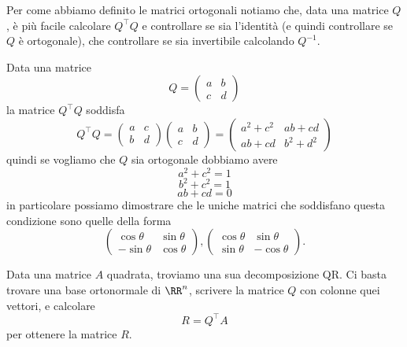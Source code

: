 \documentclass[11pt]{scrartcl}
\begin{document}
   	 Per come abbiamo definito le matrici ortogonali notiamo che, data una matrice $Q$, è più facile calcolare $Q^\intercal Q$ e controllare se sia l'identità (e quindi controllare se $Q$ è ortogonale), che controllare se sia invertibile calcolando $Q^{-1}$. 
   	 \begin{example}
   	 	Data una matrice 
   	 	$$Q=
   	 	\begin{pmatrix}
   	 		a & b \\
   	 		c & d
   	 	\end{pmatrix}
   	 	$$
   	 	la matrice $Q^\intercal Q$ soddisfa
   	 	$$
   	 	Q^\intercal Q =
   	 	\begin{pmatrix}
   	 		a & c \\
   	 		b & d
   	 	\end{pmatrix}
   	 	\begin{pmatrix}
   	 		a & b \\
   	 		c & d
   	 	\end{pmatrix}
   	 	=
   	 	\begin{pmatrix}
   	 		a^2 + c^2 & ab+cd \\
   	 		ab + cd & b^2+d^2
   	 	\end{pmatrix}
   	 	$$
   	 	quindi se vogliamo che $Q$ sia ortogonale dobbiamo avere
   	 	$$a^2+c^2=1$$
   	 	$$b^2+c^2=1$$
   	 	$$ab+cd=0$$
   	 	in particolare possiamo dimostrare che le uniche matrici che soddisfano questa condizione sono quelle della forma
   	 	$$
   	 	\begin{pmatrix}
   	 		\cos\theta & \sin\theta \\
   	 		-\sin\theta & \cos\theta
   	 	\end{pmatrix},
   	 	\begin{pmatrix}
   	 		\cos\theta & \sin\theta \\
   	 		\sin\theta & -\cos\theta
   	 	\end{pmatrix}.
   	 	$$
   	 \end{example}
   	 \begin{example}[Decomposizione QR]
   	 	Data una matrice $A$ quadrata, troviamo una sua decomposizione QR. Ci basta trovare una base ortonormale di $\RR^n$, scrivere la matrice $Q$ con colonne quei vettori, e calcolare
   	 	$$R=Q^\intercal A$$
   	 	per ottenere la matrice $R$.
   	 \end{example}
   	 
\end{document}
